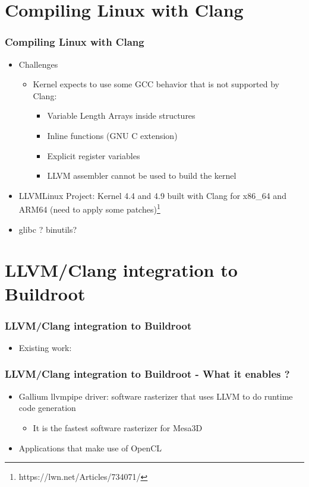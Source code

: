 \documentclass{beamer}
\begin{document}
\section{Compiling Linux with Clang}

\begin{frame}
\frametitle{Compiling Linux with Clang}
\begin{itemize}
  \item Challenges
  \begin{itemize}
    \item Kernel expects to use some GCC behavior that is not supported by Clang:
    \begin{itemize}
      \item Variable Length Arrays inside structures
      \item Inline functions (GNU C extension)
      \item Explicit register variables
      \item LLVM assembler cannot be used to build the kernel
    \end{itemize}
  \end{itemize}
  \item LLVMLinux Project: Kernel 4.4 and 4.9 built with Clang for x86\_64 and ARM64 (need to apply some patches)\footnote{https://lwn.net/Articles/734071/}
  \item glibc ? binutils?
\end{itemize}
\end{frame}
\section{LLVM/Clang integration to Buildroot}

\begin{frame}
\frametitle{LLVM/Clang integration to Buildroot}
\begin{itemize}
  \item Existing work:
\end{itemize}
\end{frame}

\begin{frame}
\frametitle{LLVM/Clang integration to Buildroot - What it enables ?}
\begin{itemize}
  \item Gallium llvmpipe driver: software rasterizer that uses LLVM to do runtime code generation
  \begin{itemize}
    \item It is the fastest software rasterizer for Mesa3D
  \end{itemize}
  \item Applications that make use of OpenCL
\end{itemize}
\end{frame}
\end{document}
